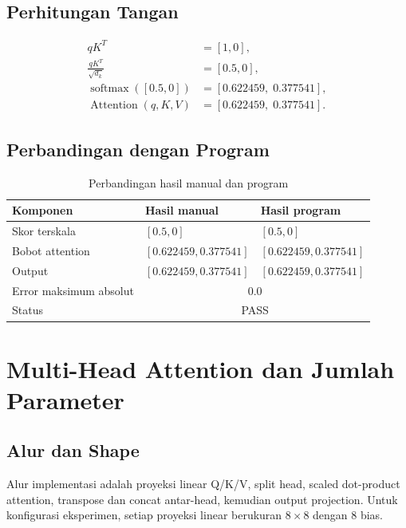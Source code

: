 \documentclass[12pt,a4paper]{article}
\begin{document}
\subsection{Perhitungan Tangan}
\begin{align*}
qK^T &= [1,0],\\
\frac{qK^T}{\sqrt{d_k}} &= [0.5,0],\\
\operatorname{softmax}([0.5,0]) &=
[0.622459,\;0.377541],\\
\operatorname{Attention}(q,K,V) &=
[0.622459,\;0.377541].
\end{align*}

\subsection{Perbandingan dengan Program}
\begin{table}[H]
    \centering
    \caption{Perbandingan hasil manual dan program}
    \label{tab:manual-verification}
    \renewcommand{\arraystretch}{1.25}
    \begin{tabular}{l l l}
        \toprule
        Komponen & Hasil manual & Hasil program \\
        \midrule
        Skor terskala & $[0.5, 0]$ & $[0.5, 0]$ \\
        Bobot attention & $[0.622459, 0.377541]$ & $[0.622459, 0.377541]$ \\
        Output & $[0.622459, 0.377541]$ & $[0.622459, 0.377541]$ \\
        Error maksimum absolut & \multicolumn{2}{c}{$0.0$} \\
        Status & \multicolumn{2}{c}{PASS} \\
        \bottomrule
    \end{tabular}
\end{table}

\section{Multi-Head Attention dan Jumlah Parameter}

\subsection{Alur dan Shape}
Alur implementasi adalah proyeksi linear Q/K/V, split head, scaled
dot-product attention, transpose dan concat antar-head, kemudian output
projection. Untuk konfigurasi eksperimen, setiap proyeksi linear berukuran
$8\times8$ dengan 8 bias.
\end{document}
